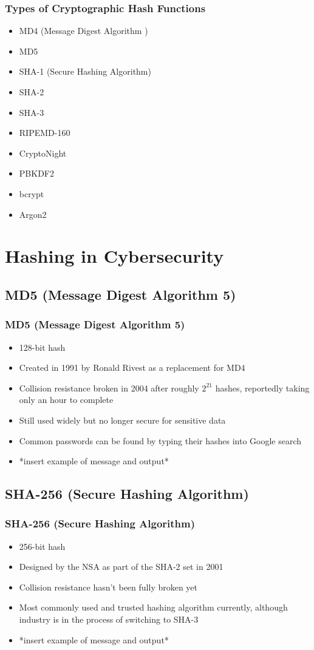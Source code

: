 \documentclass{beamer}
\begin{document}
\begin{frame}
\frametitle{Types of Cryptographic Hash Functions}
	\begin{itemize}
		\item MD4 (Message Digest Algorithm )
		\item MD5 
		\item SHA-1 (Secure Hashing Algorithm)
		\item SHA-2
		\item SHA-3 
		\item RIPEMD-160 
		\item CryptoNight
		\item PBKDF2
		\item bcrypt
		\item Argon2
	\end{itemize}
\end{frame}

\section{Hashing in Cybersecurity}

\subsection{MD5 (Message Digest Algorithm 5)}
\begin{frame}
\frametitle{MD5 (Message Digest Algorithm 5)}
	\begin{itemize}
		\item 128-bit hash
		\item Created in 1991 by Ronald Rivest as a replacement for MD4
		\item Collision resistance broken in 2004 after roughly $2^{21}$ hashes, reportedly taking only an hour to complete
		\item Still used widely but no longer secure for sensitive data
		\item Common passwords can be found by typing their hashes into Google search
		\item *insert example of message and output*
	\end{itemize}
\end{frame}

\subsection{SHA-256 (Secure Hashing Algorithm)}
\begin{frame}
\frametitle{SHA-256 (Secure Hashing Algorithm)}
	\begin{itemize}
		\item 256-bit hash
		\item Designed by the NSA as part of the SHA-2 set in 2001
		\item Collision resistance hasn't been fully broken yet
		\item Most commonly used and trusted hashing algorithm currently, although industry is in the process of switching to SHA-3
		\item *insert example of message and output*
	\end{itemize}
\end{frame}
\end{document}
